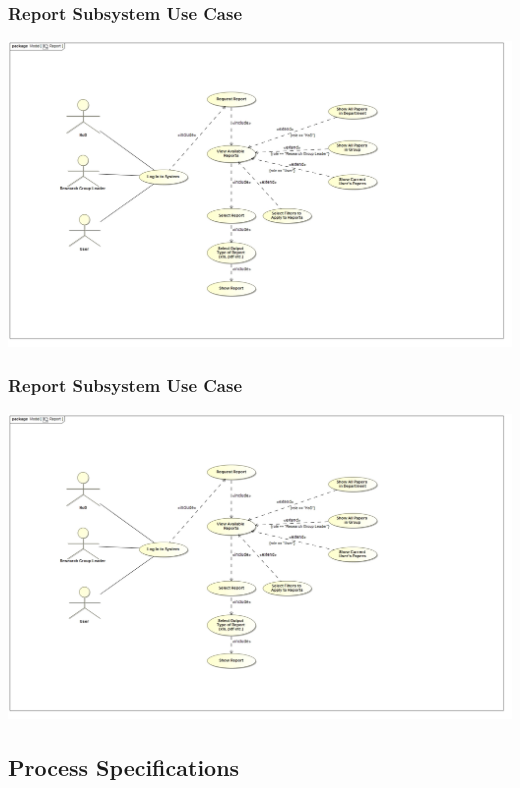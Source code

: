 \documentclass{article}
\begin{document}
			\subsubsection{Report Subsystem Use Case}
				\includegraphics[width=\textwidth]{ReportUseCase}
			\subsubsection{Report Subsystem Use Case}
				\includegraphics[width=\textwidth]{ReportUseCase}
		\subsection{Process Specifications}
\end{document}
